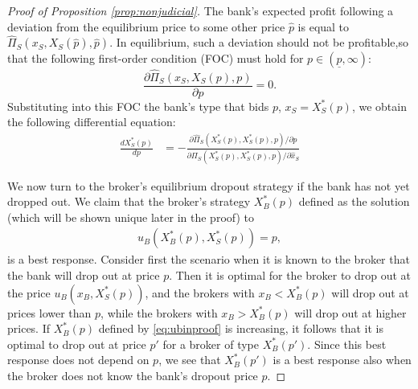\documentclass[11pt,twopage]{article}
\begin{document}
\begin{proof}[Proof of Proposition \ref{prop:nonjudicial}]
The bank's expected profit
following a deviation from the equilibrium price to some other
price $\hat{p}$ is equal to $\hat \Pi_{S}(x_{S},X_{S}(\hat{p}),\hat{p})$.
In equilibrium, such a deviation should not be profitable,so that the following first-order condition (FOC) must hold for $p\in(\underline{p},\infty)$:
\[
\frac{\partial \hat \Pi_{S}(x_{S},X_{S}(p),p)}{\partial p}=0.
\]
Substituting into this FOC the bank's type that bids $p$, $x_{S}=X_{S}^*(p)$, we obtain the following differential equation: 
\begin{align}
\frac{d X_{S}^*(p)}{dp} & =-\frac{\partial\hat \Pi_{S}(X_{S}^*(p),X_{S}^*(p),p)/\partial p}{\partial\Pi_{S}(X_{S}^*(p),X_{S}^*(p),p)/\partial\hat{x}_{S}}
\label{eq:ivp}
\end{align}

We now turn to the broker's equilibrium dropout strategy if the bank has not yet dropped out. We claim that the broker's strategy $X_B^*(p)$ defined as the solution (which will be shown unique later in the proof) to \begin{align}u_B(X_B^*(p),X_S^*(p)) = p,\label{eq:ubinproof}\end{align} is  a best response. Consider first the scenario when it is known to the broker that the bank will drop out at price $p$. 
Then it is optimal for the broker to drop out at the price $u_B(x_B,X_S^*(p))$, and the brokers with $x_B < X_B^*(p)$ will drop out at prices lower than $p$, while the brokers with $x_B > X_B^*(p)$ will drop out at higher prices.  
If  $X_B^*(p)$ defined by \eqref{eq:ubinproof} is increasing, it follows that it is optimal to drop out at price $p'$ for a broker of type $X_B^*(p')$. 
Since this best response does not depend on $p$, we see that $X_B^*(p')$ is a best response also when the broker does not know the bank's dropout price $p$. 


\end{proof}
\end{document}
